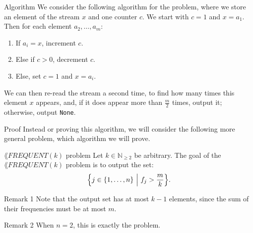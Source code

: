 \documentclass[a4paper]{article}
\begin{document}
\begin{parag}{Algorithm}
    We consider the following algorithm for the  problem, where we store an element of the stream $x$ and one counter $c$. We start with $c = 1$ and $x = a_1$. Then for each element $a_2, \ldots, a_m$:
    \begin{enumerate}
        \item If $a_i = x$, increment $c$.
        \item Else if $c > 0$, decrement $c$.
        \item Else, set $c = 1$ and $x = a_i$.
    \end{enumerate}

    We can then re-read the stream a second time, to find how many times this element $x$ appears, and, if it does appear more than $\frac{m}{2}$ times, output it; otherwise, output \texttt{None}.

    \begin{subparag}{Proof}
        Instead or proving this algorithm, we will consider the following more general problem, which algorithm we will prove.
    \end{subparag}
\end{parag}


\begin{parag}{$\lang{FREQUENT}\left(k\right)$ problem}
    Let $k \in \mathbb{N}_{\geq 2}$ be arbitrary. The goal of the $\lang{FREQUENT}\left(k\right)$ problem is to output the set: 
    \[\left\{j \in \left\{1, \ldots, n\right\} \suchthat f_j > \frac{m}{k}\right\}.\]

    \begin{subparag}{Remark 1}
        Note that the output set has at most $k - 1$ elements, since the sum of their frequencies must be at most $m$.
    \end{subparag}

    \begin{subparag}{Remark 2}
        When $n = 2$, this is exactly the  problem.
    \end{subparag}
\end{parag}
\end{document}
